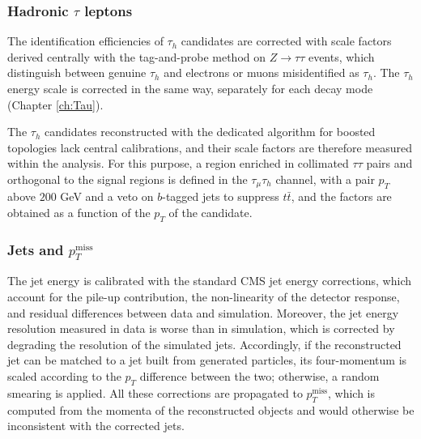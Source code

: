\subsubsection{Hadronic \texorpdfstring{$\tau$}{tau} leptons}
%
The identification efficiencies of $\tau_h$ candidates are corrected with scale factors derived centrally with the tag-and-probe method on $Z\to\tau\tau$ events, which distinguish between genuine $\tau_h$ and electrons or muons misidentified as $\tau_h$. The $\tau_h$ energy scale is corrected in the same way, separately for each decay mode (Chapter \ref{ch:Tau}).

The $\tau_h$ candidates reconstructed with the dedicated algorithm for boosted topologies lack central calibrations, and their scale factors are therefore measured within the analysis. For this purpose, a region enriched in collimated $\tau\tau$ pairs and orthogonal to the signal regions is defined in the $\tau_\mu\tau_h$ channel, with a pair $p_T$ above $200$ GeV and a veto on $b$-tagged jets to suppress $t\bar{t}$, and the factors are obtained as a function of the $p_T$ of the candidate. 

\subsubsection{Jets and \texorpdfstring{$p_T^\text{miss}$}{pTmiss}}
%
The jet energy is calibrated with the standard CMS jet energy corrections, which account for the pile-up contribution, the non-linearity of the detector response, and residual differences between data and simulation. Moreover, the jet energy resolution measured in data is worse than in simulation, which is corrected by degrading the resolution of the simulated jets. Accordingly, if the reconstructed jet can be matched to a jet built from generated particles, its four-momentum is scaled according to the $p_T$ difference between the two; otherwise, a random smearing is applied. All these corrections are propagated to $p_T^\text{miss}$, which is computed from the momenta of the reconstructed objects and would otherwise be inconsistent with the corrected jets.




